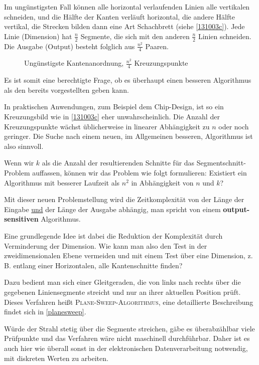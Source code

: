 \documentclass[ngerman,draft,parskip=half*,twoside]{scrreprt}
\theoremstyle{break}
\theoremstyle{nonumberbreak}
\begin{document}
Im ungünstigsten Fall können alle horizontal verlaufenden Linien
alle vertikalen schneiden, und die Hälfte der Kanten verläuft
horizontal, die andere Hälfte vertikal, die Strecken bilden dann eine
Art Schachbrett (siehe \autoref{131003c}). Jede Linie (Dimension) hat $\frac{n}{2}$ Segmente,
die sich mit den anderen $\frac{n}{2}$ Linien schneiden.  Die Ausgabe
(Output) besteht folglich aus $\frac{n^2}{4}$ Paaren. 

\begin{figure}
  \centering
%  
  \caption{Ungünstigste Kantenanordnung, $\frac{n^2}{4}$ Kreuzungspunkte}
  \label{131003c}
\end{figure}

Es ist somit eine berechtigte Frage, ob es überhaupt einen besseren
Algorithmus als den bereits vorgestellten geben kann.

In praktischen Anwendungen, zum Beispiel dem Chip-Design, ist so ein
Kreuzungsbild wie in \autoref{131003c} eher unwahrscheinlich. Die
Anzahl der Kreuzungspunkte wächst üblicherweise in linearer
Abhängigkeit zu $n$ oder noch geringer. Die Suche nach einem neuen, im
Allgemeinen besseren, Algorithmus ist also sinnvoll.

Wenn wir $k$ als die Anzahl der resultierenden Schnitte für das
Segmentschnitt-Problem auffassen, können wir das Problem wie folgt
formulieren: Existiert ein Algorithmus mit besserer Laufzeit als $n^2$ in 
Abhängigkeit von $n$ und $k$?

Mit dieser neuen Problemstellung wird die Zeitkomplexität von der Länge
der Eingabe \underline{und} der Länge der Ausgabe abhängig, man spricht
von einem \textbf{output-sensitiven} Algorithmus.

Eine grundlegende Idee ist dabei die Reduktion der Komplexität durch
Verminderung der Dimension. Wie kann man also den Test in der
zweidimensionalen Ebene vermeiden und mit einem Test über eine
Dimension, z.\,B. entlang einer Horizontalen, alle Kantenschnitte
finden?

Dazu bedient man sich einer Gleitgeraden, die von links nach rechts
über die gegebenen Liniensegmente streicht und nur an ihrer aktuellen
Position prüft. Dieses Verfahren heißt \textsc{Plane-Sweep-Algorithmus},
eine detaillierte Beschreibung findet sich in \autoref{planesweep}.

Würde der Strahl stetig über die Segmente streichen, gäbe es
überabzählbar viele Prüfpunkte und das Verfahren wäre nicht maschinell
durchführbar. Daher ist es auch hier wie überall sonst in der
elektronischen Datenverarbeitung notwendig, mit diskreten Werten zu
arbeiten.
 
\end{document}
